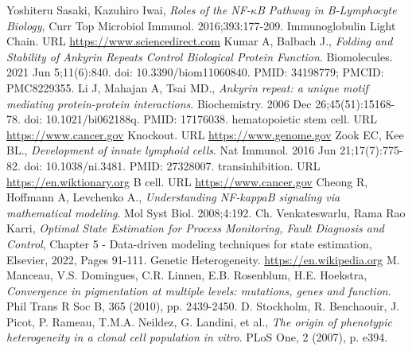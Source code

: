 \documentclass[12pt,a4paper]{report}
\begin{document}
\begin{thebibliography}{bibliography}
     Yoshiteru Sasaki, Kazuhiro Iwai, {\em Roles of the NF-$\kappa$B Pathway in B-Lymphocyte Biology}, Curr Top Microbiol Immunol. 2016;393:177-209.
     Immunoglobulin Light Chain. URL \href{https://www.sciencedirect.com/topics/immunology-and-microbiology/immunoglobulin-light-chain}{https://www.sciencedirect.com}
     Kumar A, Balbach J., {\em Folding and Stability of Ankyrin Repeats Control Biological Protein Function}. Biomolecules. 2021 Jun 5;11(6):840. doi: 10.3390/biom11060840. PMID: 34198779; PMCID: PMC8229355.
     Li J, Mahajan A, Tsai MD., {\em Ankyrin repeat: a unique motif mediating protein-protein interactions}. Biochemistry. 2006 Dec 26;45(51):15168-78. doi: 10.1021/bi062188q. PMID: 17176038.
     hematopoietic stem cell. URL \href{https://www.cancer.gov/publications/dictionaries/cancer-terms/def/hematopoietic-stem-cell}{https://www.cancer.gov}
     Knockout. URL \href{https://www.genome.gov/genetics-glossary/Knockout}{https://www.genome.gov}
     Zook EC, Kee BL., {\em Development of innate lymphoid cells}. Nat Immunol. 2016 Jun 21;17(7):775-82. doi: 10.1038/ni.3481. PMID: 27328007.
     transinhibition. URL \href{https://en.wiktionary.org/wiki/transinhibition}{https://en.wiktionary.org}
     B cell. URL \href{https://www.cancer.gov/publications/dictionaries/cancer-terms/def/b-cell}{https://www.cancer.gov}
     Cheong R, Hoffmann A, Levchenko A., {\em Understanding NF-kappaB signaling via mathematical modeling}. Mol Syst Biol. 2008;4:192.
     Ch. Venkateswarlu, Rama Rao Karri, {\em Optimal State Estimation for Process Monitoring, Fault Diagnosis and Control}, Chapter 5 - Data-driven modeling techniques for state estimation, Elsevier, 2022, Pages 91-111.
     Genetic Heterogeneity. \href{https://en.wikipedia.org/wiki/Genetic_heterogeneity}{https://en.wikipedia.org}
     M. Manceau, V.S. Domingues, C.R. Linnen, E.B. Rosenblum, H.E. Hoekstra, {\em Convergence in pigmentation at multiple levels: mutations, genes and function}. Phil Trans R Soc B, 365 (2010), pp. 2439-2450.
     D. Stockholm, R. Benchaouir, J. Picot, P. Rameau, T.M.A. Neildez, G. Landini, et al., {\em The origin of phenotypic heterogeneity in a clonal cell population in vitro}. PLoS One, 2 (2007), p. e394.

\end{thebibliography}
\end{document}

